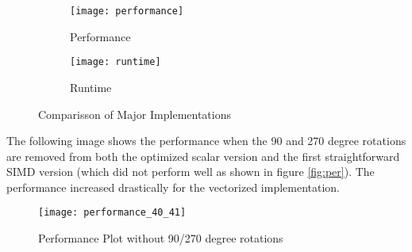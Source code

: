 \begin{figure}[H]
  \begin{subfigure}[t]{\linewidth}
    \centering
    \texttt{[image: performance]}
    \caption{Performance}
    \label{fig:perf}
  \end{subfigure}
  \begin{subfigure}[t]{\linewidth}
    \centering
    \texttt{[image: runtime]}
    \caption{Runtime}
    \label{fig:runtime}
  \end{subfigure}
  \caption{Comparisson of Major Implementations}
\end{figure}

The following image shows the performance when the 90 and 270 degree rotations
are removed from both the optimized scalar version and the first straightforward
SIMD version (which did not perform well as shown in figure \ref{fig:per}). The
performance increased drastically for the vectorized implementation.

\begin{figure}[!ht]
  \centering
  \texttt{[image: performance\_40\_41]}
  \caption{Performance Plot without 90/270 degree rotations}
  \label{fig:perf_40_41}
\end{figure}







